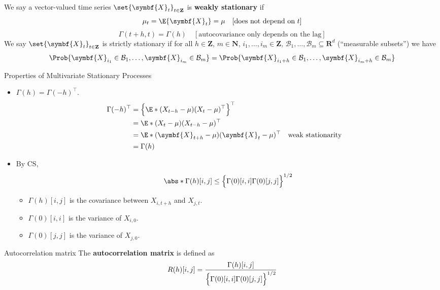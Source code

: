 \begin{Definition}{}{}
    We say a vector-valued time series $ \set{\symbf{X}_t}_{t\in\mathbf{Z}} $
    is \textbf{weakly stationary} if
    \[ \mu_t=\E{\symbf{X}_t}=\mu\quad[\text{does not depend on $ t $}] \]
    \[ \Gamma(t+h,t)=\Gamma(h)\quad[\text{autocovariance only depends on the lag}] \]
    We say $ \set{\symbf{X}_t}_{t\in\mathbf{Z}} $ is strictly stationary
    if for all $ h\in\mathbf{Z} $, $ m\in\mathbf{N} $, $ i_1,\ldots,i_m\in\mathbf{Z} $,
    $ \mathcal{B}_1,\ldots,\mathcal{B}_m\subseteq \mathbf{R}^d $ (``measurable subsets'') we have
    \[ \Prob{\symbf{X}_{i_1}\in \mathcal{B}_1,\ldots,\symbf{X}_{i_m}\in\mathcal{B}_m}=
        \Prob{\symbf{X}_{i_1+h}\in \mathcal{B}_1,\ldots, \symbf{X}_{i_m+h}\in \mathcal{B}_m} \]
\end{Definition}
\begin{Proposition}{Properties of Multivariate Stationary Processes}{}
    \begin{itemize}
        \item $ \Gamma(h)=\Gamma(-h)^\top $.
              \begin{align*}
                  \Gamma(-h)^\top
                   & =\Bigl\{\E*{(X_{t-h}-\mu)(X_t-\mu)^\top}\Bigr\}^\top                               \\
                   & =\E*{(X_t-\mu)(X_{t-h}-\mu)^\top}                                                  \\
                   & =\E*{(\symbf{X}_{t+h}-\mu)(\symbf{X}_t-\mu)^\top}    &  & \text{weak stationarity} \\
                   & =\Gamma(h)
              \end{align*}
        \item By CS,
              \[ \abs*{\Gamma(h)[i,j]}\le \Bigl\{\Gamma(0)[i,i]\Gamma(0)[j,j]\Bigr\}^{1/2} \]
              \begin{itemize}
                  \item $ \Gamma(h)[i,j] $ is the covariance between $ X_{i,t+h} $ and $ X_{j,t} $.
                  \item $ \Gamma(0)[i,i] $ is the variance of $ X_{i,0} $.
                  \item $ \Gamma(0)[j,j] $ is the variance of $ X_{j,0} $.
              \end{itemize}
    \end{itemize}
\end{Proposition}
\begin{Definition}{Autocorrelation matrix}{}
    The \textbf{autocorrelation matrix} is defined as
    \[ R(h)[i,j]=\frac{\Gamma(h)[i,j]}{\Bigl\{\Gamma(0)[i,i]\Gamma(0)[j,j]\Bigr\}^{1/2}}  \]
\end{Definition}
